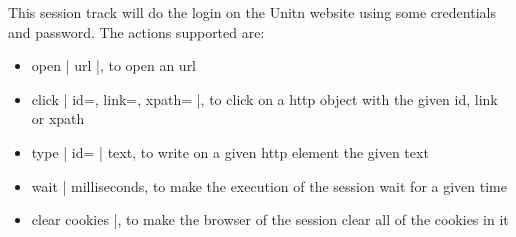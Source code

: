 This session track will do the login on the Unitn website using some credentials and password. The actions supported are:
\begin{itemize}
    \item open | url |, to open an url
    \item click | id=, link=, xpath= |, to click on a http object with the given id, link or xpath
    \item type | id= | text, to write on a given http element the given text
    \item wait | milliseconds, to make the execution of the session wait for a given time 
    \item clear cookies |, to make the browser of the session clear all of the cookies in it
\end{itemize}



